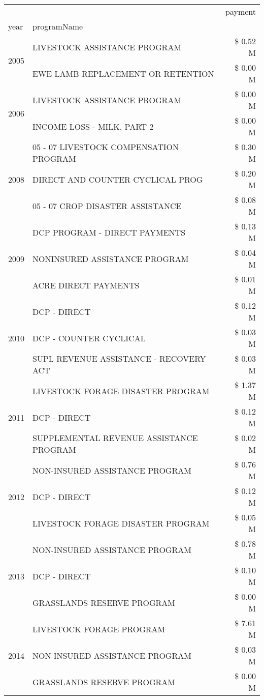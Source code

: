 \begin{tabular}{llr}
\toprule
 &  & payment \\
year & programName &  \\
\midrule
\multirow[t]{2}{*}{2005} & LIVESTOCK ASSISTANCE PROGRAM & \$ 0.52 M \\
 & EWE LAMB REPLACEMENT OR RETENTION & \$ 0.00 M \\
\cline{1-3}
\multirow[t]{2}{*}{2006} & LIVESTOCK ASSISTANCE PROGRAM & \$ 0.00 M \\
 & INCOME LOSS - MILK, PART 2 & \$ 0.00 M \\
\cline{1-3}
\multirow[t]{3}{*}{2008} & 05 - 07 LIVESTOCK COMPENSATION PROGRAM & \$ 0.30 M \\
 & DIRECT AND COUNTER CYCLICAL PROG & \$ 0.20 M \\
 & 05 - 07 CROP DISASTER ASSISTANCE & \$ 0.08 M \\
\cline{1-3}
\multirow[t]{3}{*}{2009} & DCP PROGRAM - DIRECT PAYMENTS & \$ 0.13 M \\
 & NONINSURED ASSISTANCE PROGRAM & \$ 0.04 M \\
 & ACRE DIRECT PAYMENTS & \$ 0.01 M \\
\cline{1-3}
\multirow[t]{3}{*}{2010} & DCP - DIRECT & \$ 0.12 M \\
 & DCP - COUNTER CYCLICAL & \$ 0.03 M \\
 & SUPL REVENUE ASSISTANCE - RECOVERY ACT & \$ 0.03 M \\
\cline{1-3}
\multirow[t]{3}{*}{2011} & LIVESTOCK FORAGE DISASTER PROGRAM & \$ 1.37 M \\
 & DCP - DIRECT & \$ 0.12 M \\
 & SUPPLEMENTAL REVENUE ASSISTANCE PROGRAM & \$ 0.02 M \\
\cline{1-3}
\multirow[t]{3}{*}{2012} & NON-INSURED ASSISTANCE PROGRAM & \$ 0.76 M \\
 & DCP - DIRECT & \$ 0.12 M \\
 & LIVESTOCK FORAGE DISASTER PROGRAM & \$ 0.05 M \\
\cline{1-3}
\multirow[t]{3}{*}{2013} & NON-INSURED ASSISTANCE PROGRAM & \$ 0.78 M \\
 & DCP - DIRECT & \$ 0.10 M \\
 & GRASSLANDS RESERVE PROGRAM & \$ 0.00 M \\
\cline{1-3}
\multirow[t]{3}{*}{2014} & LIVESTOCK FORAGE PROGRAM & \$ 7.61 M \\
 & NON-INSURED ASSISTANCE PROGRAM & \$ 0.03 M \\
 & GRASSLANDS RESERVE PROGRAM & \$ 0.00 M \\

\end{tabular}

